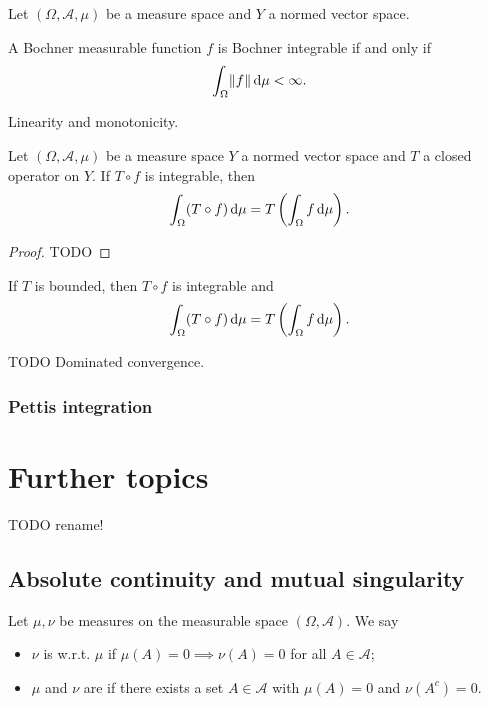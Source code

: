 \begin{proposition}
Let $(\Omega, \mathcal{A},\mu)$ be a measure space and $Y$ a normed vector space.

A Bochner measurable function $f$ is Bochner integrable \textup{if and only if}
\[ \int_\Omega \lVert f\rVert \operatorname{d \!}{\mu} < \infty. \]
\end{proposition}

\begin{proposition}
Linearity and monotonicity.
\end{proposition}

\begin{proposition}
Let $(\Omega, \mathcal{A},\mu)$ be a measure space $Y$ a normed vector space and $T$ a closed operator on $Y$. If $T\circ f$ is integrable, then
\[ \int_\Omega (T\circ f)\operatorname{d \!}{\mu} = T\left(\int_\Omega f\operatorname{d \!}{\mu}\right). \]
\end{proposition}
\begin{proof}
TODO
\end{proof}
\begin{corollary}
If $T$ is bounded, then $T\circ f$ is integrable and
\[ \int_\Omega (T\circ f)\operatorname{d \!}{\mu} = T\left(\int_\Omega f\operatorname{d \!}{\mu}\right). \]
\end{corollary}

TODO Dominated convergence.

\subsubsection{Pettis integration}


\section{Further topics}
TODO rename!

\subsection{Absolute continuity and mutual singularity}
\begin{definition}
Let $\mu,\nu$ be measures on the measurable space $(\Omega,\mathcal{A})$. We say
\begin{itemize}
\item $\nu$ is  w.r.t. $\mu$ if $\mu(A)=0\implies \nu(A) = 0$ for all $A\in\mathcal{A}$;
\item $\mu$ and $\nu$ are  if there exists a set $A\in\mathcal{A}$ with $\mu(A) = 0$ and $\nu(A^c) = 0$.
\end{itemize}
\end{definition}

